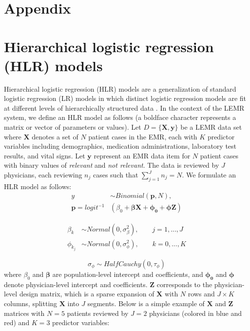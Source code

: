 \appendix
\section*{Appendix}
\section{Hierarchical logistic regression (HLR) models}\label{sec:app}
Hierarchical logistic regression (HLR) models are a generalization of standard logistic regression (LR) models in which distinct logistic regression models are fit at different levels of hierarchically structured data \cite{gelman2006data}. In the context of the LEMR system, we define an HLR model as follows (a boldface character represents a matrix or vector of parameters or values). Let $D=\{\boldsymbol{X}, \boldsymbol{y}\}$ be a LEMR data set where $\boldsymbol{X}$ denotes a set of $N$ patient cases in the EMR, each with $K$ predictor variables including demographics, medication administrations, laboratory test results, and vital signs. Let $\boldsymbol{y}$ represent an EMR data item for $N$ patient cases with binary values of \textit{relevant} and \textit{not relevant}. The data is reviewed by $J$ physicians, each reviewing $n_j$ cases such that $\sum_{j=1}^{J}{n_j}=N$. We formulate an HLR model as follows: 
\begin{equation}\label{eq:2}
\begin{split}
    y & \sim Binomial(\boldsymbol{p}, N), \\
    \boldsymbol{p} = logit^{-1} & (\beta_0 + \boldsymbol{\beta}\boldsymbol{X} + \boldsymbol{\phi_0} + \boldsymbol{\phi} \boldsymbol{Z})
\end{split}
\end{equation}

\begin{equation}\label{eq:3}
\begin{split}
    \beta_k & \sim Normal(0, \sigma_{\beta}^2), \qquad j= 1,..., J\\
    \phi_{k_j} & \sim Normal(0, \sigma_{\phi}^2),  \qquad k= 0,..., K
\end{split}
\end{equation}

\begin{equation}\label{eq:4}
    \sigma_{\phi} \sim Half Cauchy(0, \tau_{\phi})
\end{equation}
where $\beta_0$ and $\boldsymbol{\beta}$ are population-level intercept and coefficients, and $\boldsymbol{\phi_0}$ and $\boldsymbol{\phi}$ denote physician-level intercept and coefficients. $\boldsymbol{Z}$ corresponds to the physician-level design matrix, which is a sparse expansion of $\boldsymbol{X}$ with $N$ rows and $J\times K$ columns, splitting $\boldsymbol{X}$ into $J$ segments. Below is a simple example of $\boldsymbol{X}$ and $\boldsymbol{Z}$ matrices with  $N=5$ patients reviewed by $J=2$ physicians (colored in blue and red) and $K=3$ predictor variables:

